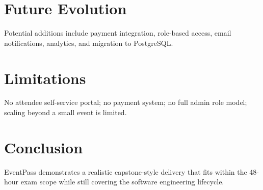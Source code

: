 \documentclass[11pt]{article}
\begin{document}
\section{Future Evolution}
Potential additions include payment integration, role-based access, email notifications, analytics, and migration to PostgreSQL.
\section{Limitations}
No attendee self-service portal; no payment system; no full admin role model; scaling beyond a small event is limited.
\section{Conclusion}
EventPass demonstrates a realistic capstone-style delivery that fits within the 48-hour exam scope while still covering the software engineering lifecycle.
\end{document}
